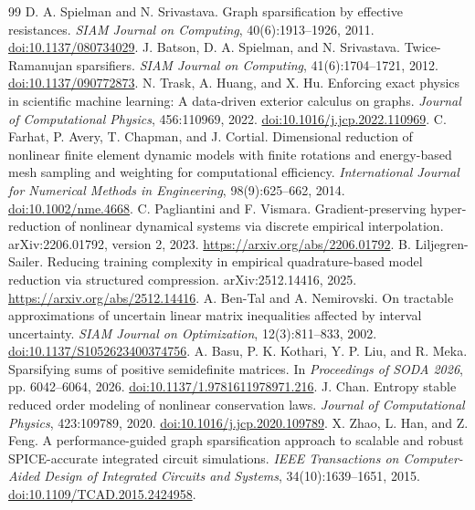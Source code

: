 \documentclass[11pt]{article}
\begin{document}
\begin{thebibliography}{99}\small
{} D. A. Spielman and N. Srivastava. Graph sparsification by effective resistances. \emph{SIAM Journal on Computing}, 40(6):1913--1926, 2011. \href{https://doi.org/10.1137/080734029}{doi:10.1137/080734029}.
 J. Batson, D. A. Spielman, and N. Srivastava. Twice-Ramanujan sparsifiers. \emph{SIAM Journal on Computing}, 41(6):1704--1721, 2012. \href{https://doi.org/10.1137/090772873}{doi:10.1137/090772873}.
 N. Trask, A. Huang, and X. Hu. Enforcing exact physics in scientific machine learning: A data-driven exterior calculus on graphs. \emph{Journal of Computational Physics}, 456:110969, 2022. \href{https://doi.org/10.1016/j.jcp.2022.110969}{doi:10.1016/j.jcp.2022.110969}.
 C. Farhat, P. Avery, T. Chapman, and J. Cortial. Dimensional reduction of nonlinear finite element dynamic models with finite rotations and energy-based mesh sampling and weighting for computational efficiency. \emph{International Journal for Numerical Methods in Engineering}, 98(9):625--662, 2014. \href{https://doi.org/10.1002/nme.4668}{doi:10.1002/nme.4668}.
 C. Pagliantini and F. Vismara. Gradient-preserving hyper-reduction of nonlinear dynamical systems via discrete empirical interpolation. arXiv:2206.01792, version 2, 2023. \url{https://arxiv.org/abs/2206.01792}.
 B. Liljegren-Sailer. Reducing training complexity in empirical quadrature-based model reduction via structured compression. arXiv:2512.14416, 2025. \url{https://arxiv.org/abs/2512.14416}.
 A. Ben-Tal and A. Nemirovski. On tractable approximations of uncertain linear matrix inequalities affected by interval uncertainty. \emph{SIAM Journal on Optimization}, 12(3):811--833, 2002. \href{https://doi.org/10.1137/S1052623400374756}{doi:10.1137/S1052623400374756}.
 A. Basu, P. K. Kothari, Y. P. Liu, and R. Meka. Sparsifying sums of positive semidefinite matrices. In \emph{Proceedings of SODA 2026}, pp. 6042--6064, 2026. \href{https://doi.org/10.1137/1.9781611978971.216}{doi:10.1137/1.9781611978971.216}.
 J. Chan. Entropy stable reduced order modeling of nonlinear conservation laws. \emph{Journal of Computational Physics}, 423:109789, 2020. \href{https://doi.org/10.1016/j.jcp.2020.109789}{doi:10.1016/j.jcp.2020.109789}.
 X. Zhao, L. Han, and Z. Feng. A performance-guided graph sparsification approach to scalable and robust SPICE-accurate integrated circuit simulations. \emph{IEEE Transactions on Computer-Aided Design of Integrated Circuits and Systems}, 34(10):1639--1651, 2015. \href{https://doi.org/10.1109/TCAD.2015.2424958}{doi:10.1109/TCAD.2015.2424958}.

\end{thebibliography}
\end{document}
